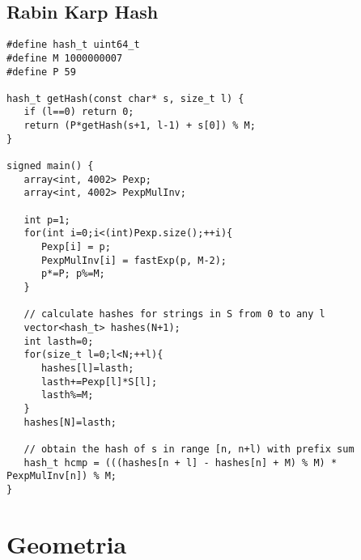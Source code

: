 \documentclass{article}
\begin{document}
\subsection{Rabin Karp Hash}
\begin{lstlisting}
#define hash_t uint64_t
#define M 1000000007
#define P 59

hash_t getHash(const char* s, size_t l) {
   if (l==0) return 0;
   return (P*getHash(s+1, l-1) + s[0]) % M;
}

signed main() {
   array<int, 4002> Pexp;
   array<int, 4002> PexpMulInv;

   int p=1;
   for(int i=0;i<(int)Pexp.size();++i){
      Pexp[i] = p;
      PexpMulInv[i] = fastExp(p, M-2);
      p*=P; p%=M;
   }
   
   // calculate hashes for strings in S from 0 to any l
   vector<hash_t> hashes(N+1);
   int lasth=0;
   for(size_t l=0;l<N;++l){
      hashes[l]=lasth;
      lasth+=Pexp[l]*S[l];
      lasth%=M;
   }
   hashes[N]=lasth;

   // obtain the hash of s in range [n, n+l) with prefix sum
   hash_t hcmp = (((hashes[n + l] - hashes[n] + M) % M) * PexpMulInv[n]) % M;
}
\end{lstlisting}

\section{Geometria}
\end{document}
